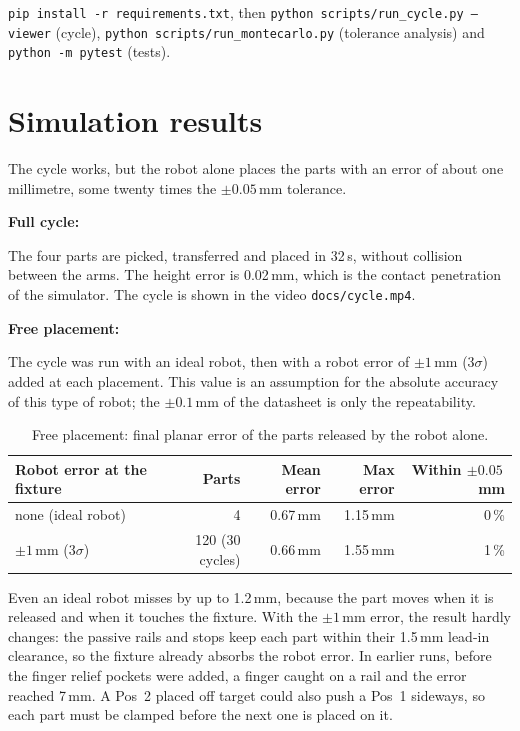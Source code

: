 \documentclass[11pt,a4paper]{article}
\newcommand{\code}[1]{\texttt{#1}}
\begin{document}
\code{pip install -r requirements.txt}, then \code{python scripts/run\_cycle.py --viewer} (cycle),
\code{python scripts/run\_montecarlo.py} (tolerance analysis) and \code{python -m pytest} (tests).

\section{Simulation results}

The cycle works, but the robot alone places the parts with an error of about one millimetre, some
twenty times the $\pm0.05$\,mm tolerance.

\textbf{Full cycle:}

The four parts are picked, transferred and placed in 32\,s, without collision between the arms.
The height error is 0.02\,mm, which is the contact penetration of the simulator. The cycle is shown
in the video \code{docs/cycle.mp4}.

\textbf{Free placement:}

The cycle was run with an ideal robot, then with a robot error of $\pm1$\,mm ($3\sigma$) added at
each placement. This value is an assumption for the absolute accuracy of this type of robot; the
$\pm0.1$\,mm of the datasheet is only the repeatability.

\begin{table}[H]
\centering
\caption{Free placement: final planar error of the parts released by the robot alone.}
\begin{tabular}{@{}lrrrr@{}}
\toprule
Robot error at the fixture & Parts & Mean error & Max error & Within $\pm0.05$\,mm\\
\midrule
none (ideal robot) & 4 & 0.67\,mm & 1.15\,mm & 0\,\%\\
$\pm1$\,mm ($3\sigma$) & 120 (30 cycles) & 0.66\,mm & 1.55\,mm & 1\,\%\\
\bottomrule
\end{tabular}
\end{table}

Even an ideal robot misses by up to 1.2\,mm, because the part moves when it is released and when it
touches the fixture. With the $\pm1$\,mm error, the result hardly changes: the passive rails and
stops keep each part within their 1.5\,mm lead-in clearance, so the fixture already absorbs the
robot error. In earlier runs, before the finger relief pockets were added, a finger caught on a rail
and the error reached 7\,mm. A Pos~2 placed off target could also push a Pos~1 sideways, so each
part must be clamped before the next one is placed on it.
\end{document}
